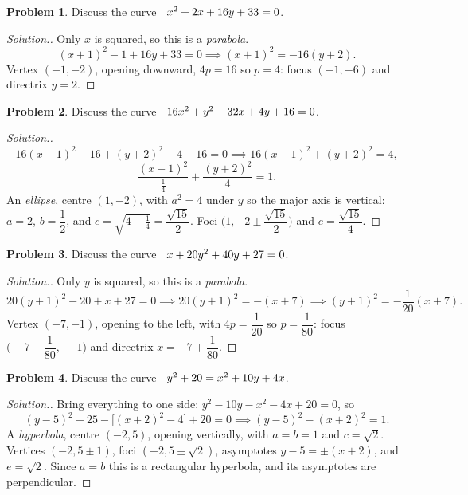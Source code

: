 \documentclass[11pt,a4paper]{article}
\theoremstyle{definition}
\newtheorem{problemx}{Problem}[subsection]
\newenvironment{problem}{\begin{problemx}}{\end{problemx}}
\newenvironment{solution}
  {\renewcommand{\qedsymbol}{}\begin{proof}[\textit{Solution}.]}
  {\end{proof}}
\begin{document}
\begin{problem}
Discuss the curve $\hspace{0.2cm} x^2 + 2x + 16y + 33 = 0$.
\end{problem}
\begin{solution}
Only $x$ is squared, so this is a \emph{parabola}.
$$(x+1)^2 - 1 + 16y + 33 = 0 \implies (x+1)^2 = -16(y+2) .$$
Vertex $(-1,-2)$, opening downward, $4p = 16$ so $p = 4$: focus $(-1,-6)$ and
directrix $y = 2$.
\end{solution}

\begin{problem}
Discuss the curve $\hspace{0.2cm} 16x^2 + y^2 - 32x + 4y + 16 = 0$.
\end{problem}
\begin{solution}
$$16(x-1)^2 - 16 + (y+2)^2 - 4 + 16 = 0 \implies 16(x-1)^2 + (y+2)^2 = 4 ,$$
$$\frac{(x-1)^2}{\frac{1}{4}} + \frac{(y+2)^2}{4} = 1 .$$
An \emph{ellipse}, centre $(1,-2)$, with $a^2 = 4$ under $y$ so the major axis
is vertical: $a = 2$, $b = \dfrac{1}{2}$, and
$c = \sqrt{4 - \frac14} = \dfrac{\sqrt{15}}{2}$. Foci
$\Big(1, -2 \pm \dfrac{\sqrt{15}}{2}\Big)$ and
$e = \dfrac{\sqrt{15}}{4}$.
\end{solution}

\begin{problem}
Discuss the curve $\hspace{0.2cm} x + 20y^2 + 40y + 27 = 0$.
\end{problem}
\begin{solution}
Only $y$ is squared, so this is a \emph{parabola}.
$$20(y+1)^2 - 20 + x + 27 = 0 \implies 20(y+1)^2 = -(x+7)
\implies (y+1)^2 = -\frac{1}{20}(x+7).$$
Vertex $(-7,-1)$, opening to the left, with $4p = \dfrac{1}{20}$ so
$p = \dfrac{1}{80}$: focus $\Big(-7 - \dfrac{1}{80},\, -1\Big)$ and directrix
$x = -7 + \dfrac{1}{80}$.
\end{solution}

\begin{problem}
Discuss the curve $\hspace{0.2cm} y^2 + 20 = x^2 + 10y + 4x$.
\end{problem}
\begin{solution}
Bring everything to one side: $y^2 - 10y - x^2 - 4x + 20 = 0$, so
$$(y-5)^2 - 25 - \big[(x+2)^2 - 4\big] + 20 = 0
\implies (y-5)^2 - (x+2)^2 = 1 .$$
A \emph{hyperbola}, centre $(-2,5)$, opening vertically, with $a = b = 1$ and
$c = \sqrt2$. Vertices $(-2, 5\pm 1)$, foci $(-2, 5\pm\sqrt2)$, asymptotes
$y - 5 = \pm(x+2)$, and $e = \sqrt2$. Since $a = b$ this is a rectangular
hyperbola, and its asymptotes are perpendicular.
\end{solution}
\end{document}
